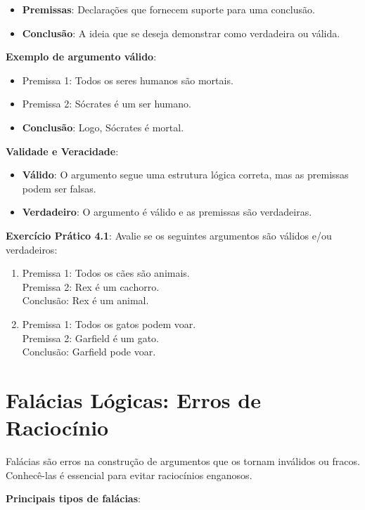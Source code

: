 \documentclass[a4paper,12pt]{book}
\begin{document}
\begin{itemize}
    \item \textbf{Premissas}: Declarações que fornecem suporte para uma conclusão.
    \item \textbf{Conclusão}: A ideia que se deseja demonstrar como verdadeira ou válida.
\end{itemize}

\textbf{Exemplo de argumento válido}:

\begin{itemize}
    \item Premissa 1: Todos os seres humanos são mortais.
    \item Premissa 2: Sócrates é um ser humano.
    \item \textbf{Conclusão}: Logo, Sócrates é mortal.
\end{itemize}

\textbf{Validade e Veracidade}:

\begin{itemize}
    \item \textbf{Válido}: O argumento segue uma estrutura lógica correta, mas as premissas podem ser falsas.
    \item \textbf{Verdadeiro}: O argumento é válido e as premissas são verdadeiras.
\end{itemize}


\textbf{Exercício Prático 4.1}: Avalie se os seguintes argumentos são válidos e/ou verdadeiros:
\begin{enumerate}
    \item Premissa 1: Todos os cães são animais.\\
    Premissa 2: Rex é um cachorro.\\
    Conclusão: Rex é um animal.
    \item Premissa 1: Todos os gatos podem voar.\\
    Premissa 2: Garfield é um gato.\\
    Conclusão: Garfield pode voar.
\end{enumerate}

\section{Falácias Lógicas: Erros de Raciocínio}
Falácias são erros na construção de argumentos que os tornam inválidos ou fracos. Conhecê-las é essencial para evitar raciocínios enganosos.

\textbf{Principais tipos de falácias}:
\end{document}
